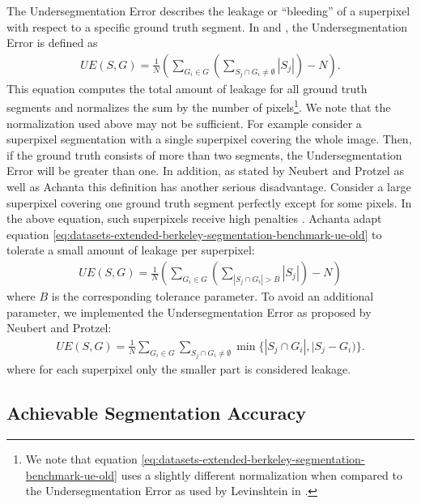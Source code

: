 The Undersegmentation Error describes the leakage or ``bleeding'' \cite{LevinshteinStereKutulakosFleetDickinsonSiddiqi:2009} of a superpixel with respect to a specific ground truth segment. In \cite{LiuTuzelRamalingamChellappa:2011} and \cite{VekslerBoykovMehrani:2010}, the Undersegmentation Error is defined as
\begin{align}
	\label{eq:datasets-extended-berkeley-segmentation-benchmark-ue-old}
	UE(S,G) = \frac{1}{N} \left( \sum_{G_i \in G} \left( \sum_{S_j \cap G_i \neq \emptyset} |S_j|\right) - N\right).
\end{align}
This equation computes the total amount of leakage for all ground truth segments and normalizes the sum by the number of pixels\footnote{We note that equation \eqref{eq:datasets-extended-berkeley-segmentation-benchmark-ue-old} uses a slightly different normalization when compared to the Undersegmentation Error as used by Levinshtein \etal in \cite{LevinshteinStereKutulakosFleetDickinsonSiddiqi:2009}.}. We note that the normalization used above may not be sufficient. For example consider a superpixel segmentation with a single superpixel covering the whole image. Then, if the ground truth consists of more than two segments, the Undersegmentation Error will be greater than one. In addition, as stated by Neubert and Protzel \cite{NeubertProtzel:2012} as well as Achanta \etal \cite{AchantaShajiSmithLucchiFuaSuesstrunk:2010} this definition has another serious disadvantage. Consider a large superpixel covering one ground truth segment perfectly except for some pixels. In the above equation, such superpixels receive high penalties \cite{NeubertProtzel:2012}. Achanta \etal adapt equation \eqref{eq:datasets-extended-berkeley-segmentation-benchmark-ue-old} to tolerate a small amount of leakage per superpixel:
\begin{align}
	UE(S,G) = \frac{1}{N} \left( \sum_{G_i \in G} \left( \sum_{|S_j \cap G_i| > B} |S_j|\right) - N\right)
\end{align}
where $B$ is the corresponding tolerance parameter. To avoid an additional parameter, we implemented the Undersegmentation Error as proposed by Neubert and Protzel:
\begin{align}
	\label{eq:datasets-extended-berkeley-segmentation-benchmark-ue}
	UE(S,G) = \frac{1}{N} \sum_{G_i \in G} \sum_{S_j \cap G_i \neq \emptyset} \min \{|S_j \cap G_i|, |S_j - G_i)\}.
\end{align}
where for each superpixel only the smaller part is considered leakage.

\subsection{Achievable Segmentation Accuracy}

